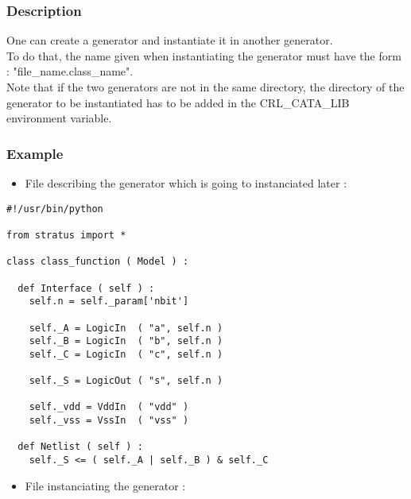 \subsubsection{Description}

One can create a generator and instantiate it in another generator.\\
\indent To do that, the name given when instantiating the generator must have the form : "file\_name.class\_name".\\
    
\indent Note that if the two generators are not in the same directory, the directory of the generator to be instantiated has to be added in the CRL\_CATA\_LIB environment variable.
    
\subsubsection{Example}

\begin{itemize}
    \item File describing the generator which is going to instanciated later :
\end{itemize}

\begin{verbatim}
#!/usr/bin/python

from stratus import *

class class_function ( Model ) :
    
  def Interface ( self ) :
    self.n = self._param['nbit']
      
    self._A = LogicIn  ( "a", self.n )
    self._B = LogicIn  ( "b", self.n )
    self._C = LogicIn  ( "c", self.n )
    
    self._S = LogicOut ( "s", self.n )
    
    self._vdd = VddIn  ( "vdd" )
    self._vss = VssIn  ( "vss" )

  def Netlist ( self ) :
    self._S <= ( self._A | self._B ) & self._C
\end{verbatim}

\begin{itemize}
    \item File instanciating the generator :
\end{itemize}

